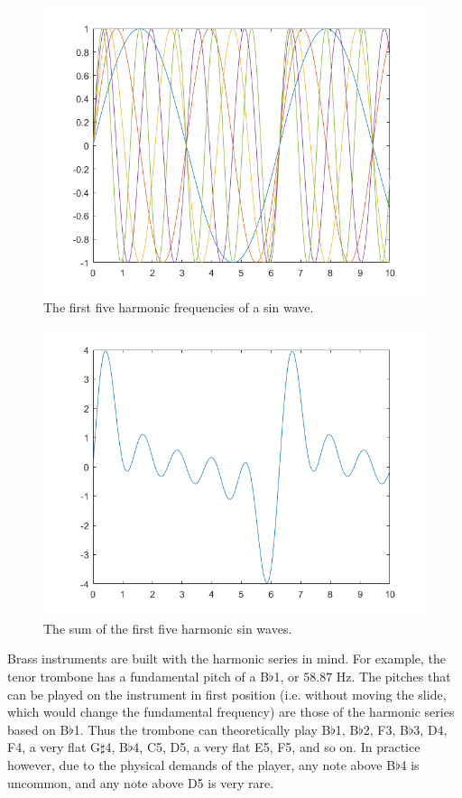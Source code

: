 \begin{figure}
	\centering
	\includegraphics[width=\textwidth]{../figures/harmonicSinWaves.png}
	\caption{The first five harmonic frequencies of a sin wave.}
	\label{fig:harmonics}
\end{figure}

\begin{figure}
	\centering
	\includegraphics[width=\textwidth]{../figures/summedSinWaves.png}
	\caption{The sum of the first five harmonic sin waves.}
	\label{fig:summedHarmonics}
\end{figure}

Brass instruments are built with the harmonic series in mind.
For example, the tenor trombone has a fundamental pitch of a B$\flat$1, or $58.87$ Hz.
The pitches that can be played on the instrument in first position (i.e. without moving the slide, which would change the fundamental frequency) are those of the harmonic series based on B$\flat$1.
Thus the trombone can theoretically play B$\flat$1, B$\flat$2, F3, B$\flat$3, D4, F4, a very flat G$\sharp$4, B$\flat$4, C5, D5, a very flat E5, F5, and so on.
In practice however, due to the physical demands of the player, any note above B$\flat$4 is uncommon, and any note above D5 is very rare.

